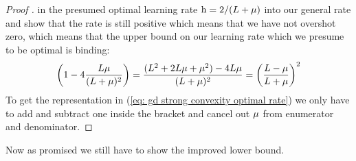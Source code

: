 \begin{proof}[Proof {\parencite[Theorem 2.1.15]{nesterovLecturesConvexOptimization2018}}]
	in the presumed optimal learning rate \(\text{h}=2/(L+\mu)\) into
	our general rate and show that the rate is still positive which means that
	we have not overshot zero, which means that the upper bound on our learning
	rate which we presume to be optimal is binding:
	\begin{align*}
		\left(1- 4 \frac{L\mu}{(L+\mu)^2}\right)
		= \frac{(L^2 + 2L\mu + \mu^2) - 4 L\mu}{(L+\mu)^2}
		= \left(\frac{L-\mu}{L+\mu}\right)^2
	\end{align*}
	To get the representation in (\ref{eq: gd strong convexity optimal rate}) we
	only have to add and subtract one inside the bracket and cancel out
	\(\mu\) from enumerator and denominator.
\end{proof}

Now as promised we still have to show the improved lower bound.

